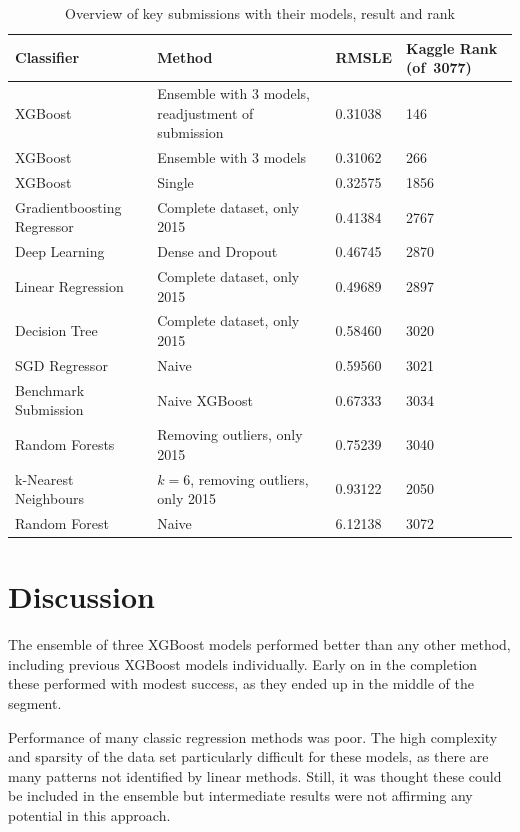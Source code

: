 \documentclass[a4paper,11pt,twocolumn]{article}
\begin{document}
\begin{table}[ht]
    \centering
    \begin{tabular}{| p{} | p{} | p{} |
    p{}|}
    \hline
    \textbf{Classifier} & \textbf{Method} & \textbf{RMSLE} & \textbf{Kaggle Rank
    (of~3077)} \\
    \hline
    XGBoost & Ensemble with 3 models, readjustment of submission & 0.31038 & 146 \\
    \hline
    XGBoost & Ensemble with 3 models & 0.31062 & 266 \\
    \hline
    XGBoost & Single & 0.32575 & 1856 \\
    \hline
    Gradientboosting Regressor & Complete dataset, only 2015 & 0.41384 & 2767 \\
    \hline
    Deep Learning & Dense and Dropout & 0.46745 & 2870 \\
    \hline
    Linear Regression & Complete dataset, only 2015 & 0.49689 & 2897 \\
    \hline
    Decision Tree & Complete dataset, only 2015 & 0.58460 & 3020 \\
    \hline
    SGD Regressor & Naive & 0.59560 & 3021 \\
    \hline
    Benchmark Submission & Naive XGBoost & 0.67333 & 3034 \\
    \hline
    Random Forests & Removing outliers, only 2015 & 0.75239 & 3040 \\
    \hline
    k-Nearest Neighbours & $k = 6$, removing outliers, only 2015 & 0.93122 &
    2050 \\
    \hline
    Random Forest & Naive & 6.12138 & 3072 \\
    \hline
    \end{tabular}
\caption{Overview of key submissions with their models, result and rank}
\label{tbl:xval}
\end{table}

\section{Discussion}
The ensemble of three XGBoost models performed better than any other method,
including previous XGBoost models individually. Early on in the completion these
performed with modest success, as they ended up in the middle of the segment.

Performance of many classic regression methods was poor. The high complexity and
sparsity of the data set particularly difficult for these models, as there are
many patterns not identified by linear methods. Still, it was thought these
could be included in the ensemble but intermediate results were not affirming
any potential in this approach.
\end{document}
